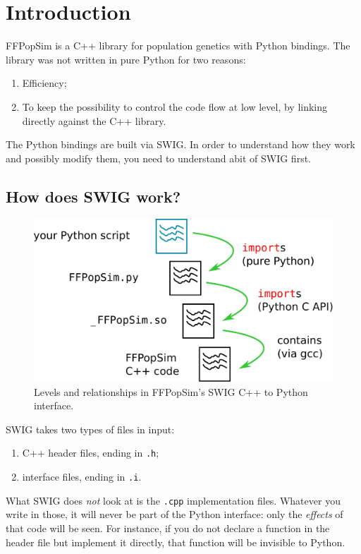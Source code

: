 \documentclass[12pt,a4paper,notitlepage,onecolumn]{article}
\title{\Title}
\author{\Author}
\date{\today}
\begin{document}
\maketitle

\section{Introduction}
FFPopSim is a C++ library for population genetics with Python bindings. The
library was not written in pure Python for two reasons:
\begin{enumerate}
\item Efficiency;
\item To keep the possibility to control the code flow at low
level, by linking directly against the C++ library.
\end{enumerate}
The Python bindings are built via SWIG. In order to understand how they work
and possibly modify them, you need to understand abit of SWIG first.

\subsection{How does SWIG work?}
\begin{figure}
\begin{center}
\includegraphics[width=0.7\linewidth]{schematic.pdf}
\caption{Levels and relationships in FFPopSim's SWIG C++ to Python interface.}
\end{center}
\end{figure}
SWIG takes two types of files in input:
\begin{enumerate}
\item {\color{blue}C++ header files}, ending in \texttt{.h};
\item {\color{red}interface files}, ending in \texttt{.i}.
\end{enumerate}
What SWIG does \textit{not} look at is the \texttt{.cpp} implementation files.
Whatever you write in those, it will never be part of the Python interface: only
the \textit{effects} of that code will be seen. For instance, if you do not
declare a function in the header file but implement it directly, that function
will be invisible to Python.
\end{document}
